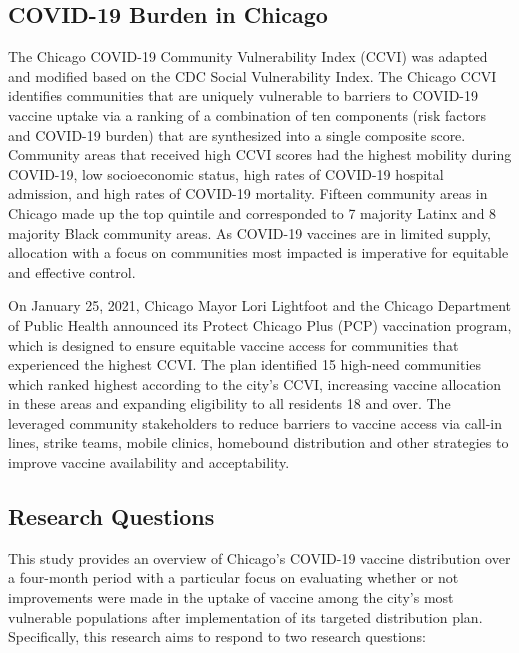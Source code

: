 \documentclass[
]{article}
\begin{document}
\hypertarget{covid-19-burden-in-chicago}{%
\subsection{COVID-19 Burden in Chicago}\label{covid-19-burden-in-chicago}}

The Chicago COVID-19 Community Vulnerability Index (CCVI) was adapted and modified based on the CDC Social Vulnerability Index. The Chicago CCVI identifies communities that are uniquely vulnerable to barriers to COVID-19 vaccine uptake via a ranking of a combination of ten components (risk factors and COVID-19 burden) that are synthesized into a single composite score. Community areas that received high CCVI scores had the highest mobility during COVID-19, low socioeconomic status, high rates of COVID-19 hospital admission, and high rates of COVID-19 mortality. Fifteen community areas in Chicago made up the top quintile and corresponded to 7 majority Latinx and 8 majority Black community areas. As COVID-19 vaccines are in limited supply, allocation with a focus on communities most impacted is imperative for equitable and effective control.

On January 25, 2021, Chicago Mayor Lori Lightfoot and the Chicago Department of Public Health announced its Protect Chicago Plus (PCP) vaccination program, which is designed to ensure equitable vaccine access for communities that experienced the highest CCVI. The plan identified 15 high-need communities which ranked highest according to the city's CCVI, increasing vaccine allocation in these areas and expanding eligibility to all residents 18 and over. The leveraged community stakeholders to reduce barriers to vaccine access via call-in lines, strike teams, mobile clinics, homebound distribution and other strategies to improve vaccine availability and acceptability.

\hypertarget{research-questions}{%
\subsection{Research Questions}\label{research-questions}}

This study provides an overview of Chicago's COVID-19 vaccine distribution over a four-month period with a particular focus on evaluating whether or not improvements were made in the uptake of vaccine among the city's most vulnerable populations after implementation of its targeted distribution plan. Specifically, this research aims to respond to two research questions:
\end{document}
